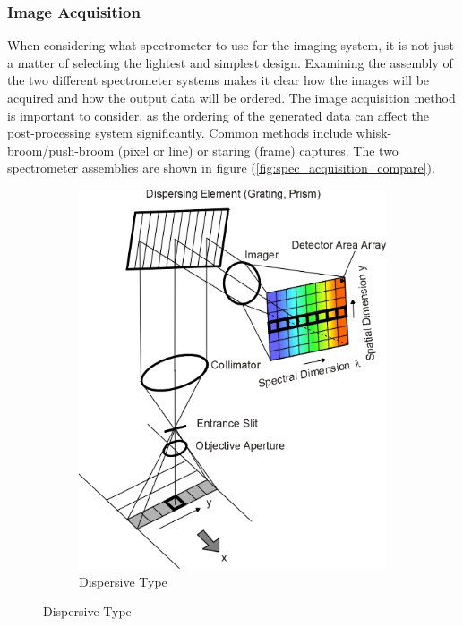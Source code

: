 \subsubsection*{Image Acquisition}
When considering what spectrometer to use for the imaging system, it is not just a  matter of selecting the lightest and simplest design. Examining the assembly of the two different spectrometer systems makes it clear how the images will be acquired and how the output data will be ordered. The image acquisition method is important to consider, as the ordering of the generated data can affect the post-processing system significantly. Common methods include whisk-broom/push-broom (pixel or line) or staring (frame) captures. The two spectrometer assemblies are shown in figure (\ref{fig:spec_acquisition_compare}). 
\begin{figure}[H]
    \centering
    \begin{subfigure}[b]{0.45\textwidth}
        \includegraphics[width=\textwidth]{figures/Orbiter/spectrometer_colli_nieke.jpg}
        \caption{Dispersive Type}\label{fig:spec_dispersion_acq}

\end{subfigure}
\end{figure}
